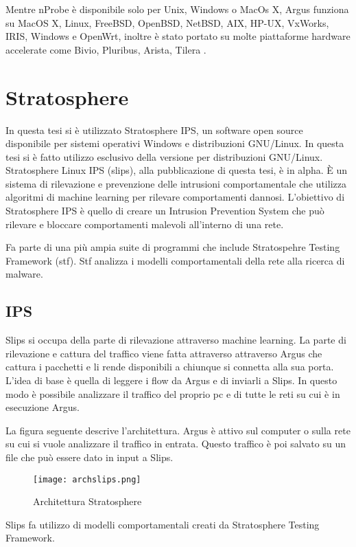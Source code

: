 \documentclass[../main.tex]{subfiles}
\begin{document}
Mentre nProbe è disponibile solo per Unix, Windows o MacOs X, Argus funziona su MacOS X, Linux, FreeBSD, OpenBSD, NetBSD, AIX, HP-UX, VxWorks, IRIS, Windows e OpenWrt, inoltre è stato portato su molte piattaforme hardware accelerate come Bivio, Pluribus, Arista, Tilera \cite{Argus}. 

\section{Stratosphere}
In questa tesi si è utilizzato Stratosphere IPS, un software open source disponibile per sistemi operativi Windows e distribuzioni GNU/Linux. In questa tesi si è fatto utilizzo esclusivo della versione per distribuzioni GNU/Linux.
Stratosphere Linux IPS (slips), alla pubblicazione di questa tesi, è in alpha. È un sistema di rilevazione e prevenzione delle intrusioni comportamentale che utilizza algoritmi di machine learning per rilevare comportamenti dannosi. 
L'obiettivo di Stratosphere IPS è quello di creare un Intrusion Prevention System che può rilevare e bloccare comportamenti malevoli all'interno di una rete.

Fa parte di una più ampia suite di programmi che include Stratospehre Testing Framework (stf). Stf analizza i modelli comportamentali della rete alla ricerca di malware.

\subsection{IPS}
Slips si occupa della parte di rilevazione attraverso machine learning. La parte di rilevazione e cattura del traffico viene fatta attraverso attraverso Argus che cattura i pacchetti e li rende disponibili a chiunque si connetta alla sua porta. L'idea di base è quella di leggere i flow da Argus e di inviarli a Slips. In questo modo è possibile analizzare il traffico del proprio pc e di tutte le reti su cui è in esecuzione Argus. 

La figura seguente descrive l'architettura. Argus è attivo sul computer o sulla rete su cui si vuole analizzare il traffico in entrata. Questo traffico è poi salvato su un file che può essere dato in input a Slips.

\begin{figure}[H]
\centering
\texttt{[image: archslips.png]}
\caption{Architettura Stratosphere}
\end{figure}

Slips fa utilizzo di modelli comportamentali creati da Stratosphere Testing Framework.
\end{document}
